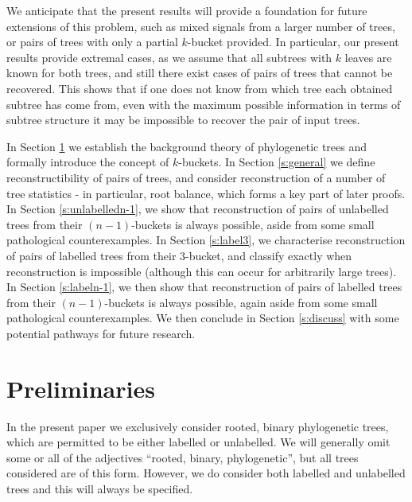 \documentclass[12pt]{article}
\theoremstyle{definition}
\begin{document}
We anticipate that the present results will provide a foundation for future extensions of this problem, such as mixed signals from a larger number of trees, or pairs of trees with only a partial $k$-bucket provided. In particular, our present results provide extremal cases, as we assume that all subtrees with $k$ leaves are known for both trees, and still there exist cases of pairs of trees that cannot be recovered. This shows that if one does not know from which tree each obtained subtree has come from, even with the maximum possible information in terms of subtree structure it may be impossible to recover the pair of input trees. 

In Section \ref{s:prelim} we establish the background theory of phylogenetic trees and formally introduce the concept of $k$-buckets. In Section \ref{s:general} we define reconstructibility of pairs of trees, and consider reconstruction of a number of tree statistics - in particular, root balance, which forms a key part of later proofs. In Section \ref{s:unlabelledn-1}, we show that reconstruction of pairs of unlabelled trees from their $(n-1)$-buckets is always possible, aside from some small pathological counterexamples. In Section \ref{s:label3}, we characterise reconstruction of pairs of labelled trees from their $3$-bucket, and classify exactly when reconstruction is impossible (although this can occur for arbitrarily large trees). In Section \ref{s:labeln-1}, we then show that reconstruction of pairs of labelled trees from their $(n-1)$-buckets is always possible, again aside from some small pathological counterexamples. We then conclude in Section \ref{s:discuss} with some potential pathways for future research.

\section{Preliminaries}\label{s:prelim}

In the present paper we exclusively consider rooted, binary phylogenetic trees, which are permitted to be either labelled or unlabelled. We will generally omit some or all of the adjectives ``rooted, binary, phylogenetic'', but all trees considered are of this form. However, we do consider both labelled and unlabelled trees and this will always be specified.
\end{document}
